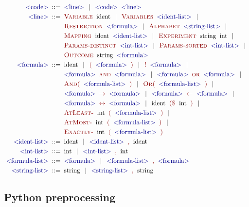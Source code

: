 \newcommand{\symb}[1]{\;\textcolor{DarkBlue}{\textrm{$<$#1$>$}}\;}
\newcommand{\txt}[1]{\;\textcolor{DarkRed}{\textsc{#1}}\;}
\newcommand{\term}[1]{\;\textrm{#1}\;}
\begin{align*}
\symb{code} ::=\;& \symb{line} \| \symb{code} \symb{line}\\
\symb{line} ::=\;& \txt{Variable} \term{ident} \| \txt{Variables} \symb{ident-list} \| \\
  & \txt{Restriction} \symb{formula} \| \txt{Alphabet} \symb{string-list} \| \\
  & \txt{Mapping} \term{ident} \symb{ident-list} \| \txt{Experiment} \term{string} \term{int} \| \\
  & \txt{Params-distinct} \symb{int-list} \| \txt{Params-sorted} \symb{int-list} \| \\
  & \txt{Outcome} \term{string} \symb{formula} \\
\symb{formula} ::=\;&  \term{ident} \| \txt{(} \symb{formula} \txt{)} \| \txt{!} \symb{formula} \| \\
 & \symb{formula} \txt{and} \symb{formula} \| \symb{formula} \txt{or} \symb{formula} \| \\
 & \txt{And(} \symb{formula-list} \txt{)} \| \txt{Or(} \symb{formula-list} \txt{)} \| \\
 & \symb{formula} \txt{$\rightarrow$} \symb{formula} \| \symb{formula} \txt{$\leftarrow$} \symb{formula} \| \\
 & \symb{formula} \txt{$\leftrightarrow$} \symb{formula} \| \term{ident} \txt{(\$} \term{int} \txt{)} \| \\
 & \txt{AtLeast-} \term{int} \txt{(} \symb{formula-list} \txt{)} \| \\
 & \txt{AtMost-} \term{int} \txt{(} \symb{formula-list} \txt{)} \| \\
 & \txt{Exactly-} \term{int} \txt{(} \symb{formula-list} \txt{)} \\
\symb{ident-list} ::=\;& \term{ident} \| \symb{ident-list} \txt{,} \term{ident} \\
\symb{int-list} ::=\;& \term{int} \| \symb{int-list} \txt{,} \term{int} \\
\symb{formula-list} ::=\;& \symb{formula} \| \symb{formula-list} \txt{,} \symb{formula} \\
\symb{string-list} ::=\;& \term{string} \| \symb{string-list} \txt{,} \term{string}
\end{align*}

\subsection{Python preprocessing}

